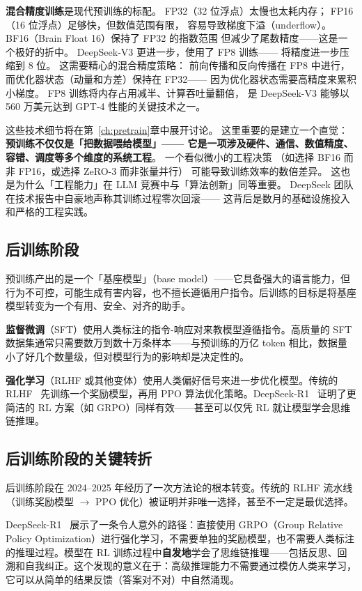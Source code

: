 \textbf{混合精度训练}是现代预训练的标配。
FP32（32 位浮点）太慢也太耗内存；
FP16（16 位浮点）足够快，但数值范围有限，
容易导致梯度下溢（underflow）。
BF16（Brain Float 16）保持了 FP32 的指数范围
但减少了尾数精度——这是一个极好的折中。
DeepSeek-V3 更进一步，使用了 FP8 训练——
将精度进一步压缩到 8 位。
这需要精心的混合精度策略：
前向传播和反向传播在 FP8 中进行，
而优化器状态（动量和方差）保持在 FP32——
因为优化器状态需要高精度来累积小梯度。
FP8 训练将内存占用减半、计算吞吐量翻倍，
是 DeepSeek-V3 能够以 560 万美元达到 GPT-4 性能的关键技术之一。

这些技术细节将在第~\ref{ch:pretrain}章中展开讨论。
这里重要的是建立一个直觉：
\textbf{预训练不仅仅是「把数据喂给模型」——
它是一项涉及硬件、通信、数值精度、容错、调度等多个维度的系统工程}。
一个看似微小的工程决策
（如选择 BF16 而非 FP16，或选择 ZeRO-3 而非张量并行）
可能导致训练效率的数倍差异。
这也是为什么「工程能力」在 LLM 竞赛中与「算法创新」同等重要。
DeepSeek 团队在技术报告中自豪地声称其训练过程零次回滚——
这背后是数月的基础设施投入和严格的工程实践。

\subsection{后训练阶段}

预训练产出的是一个「基座模型」（base model）——它具备强大的语言能力，但行为不可控，可能生成有害内容，也不擅长遵循用户指令。后训练的目标是将基座模型转变为一个有用、安全、对齐的助手。

\textbf{监督微调}（SFT）使用人类标注的指令-响应对来教模型遵循指令。高质量的 SFT 数据集通常只需要数万到数十万条样本——与预训练的万亿 token 相比，数据量小了好几个数量级，但对模型行为的影响却是决定性的。

\textbf{强化学习}（RLHF 或其他变体）使用人类偏好信号来进一步优化模型。传统的 RLHF~\cite{ouyang2022rlhf} 先训练一个奖励模型，再用 PPO 算法优化策略。DeepSeek-R1~\cite{deepseekr1} 证明了更简洁的 RL 方案（如 GRPO）同样有效——甚至可以仅凭 RL 就让模型学会思维链推理。

\subsection{后训练阶段的关键转折}

后训练阶段在 2024--2025 年经历了一次方法论的根本转变。传统的 RLHF 流水线（训练奖励模型 $\to$ PPO 优化）被证明并非唯一选择，甚至不一定是最优选择。

DeepSeek-R1~\cite{deepseekr1} 展示了一条令人意外的路径：直接使用 GRPO（Group Relative Policy Optimization）进行强化学习，不需要单独的奖励模型，也不需要人类标注的推理过程。模型在 RL 训练过程中\textbf{自发地}学会了思维链推理——包括反思、回溯和自我纠正。这个发现的意义在于：高级推理能力不需要通过模仿人类来学习，它可以从简单的结果反馈（答案对不对）中自然涌现。

